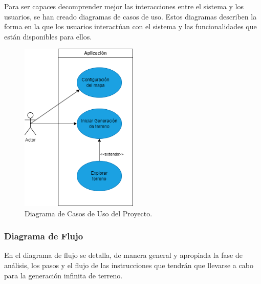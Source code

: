 Para ser capaces decomprender mejor las interacciones entre el sistema y los usuarios, se han creado diagramas de casos de uso. Estos diagramas describen la forma en la que los usuarios interactúan con el sistema y las funcionalidades que están disponibles para ellos.

\begin{figure}[H]
    \centering
    \includegraphics[width=0.5\textwidth]{img/UseCases.png}
    \caption{Diagrama de Casos de Uso del Proyecto.}
\end{figure}

\newpage
\subsubsection{Diagrama de Flujo}

En el diagrama de flujo se detalla, de manera general y apropiada la fase de análisis, los pasos y el flujo de las instrucciones que tendrán que llevarse a cabo para la generación infinita de terreno.

